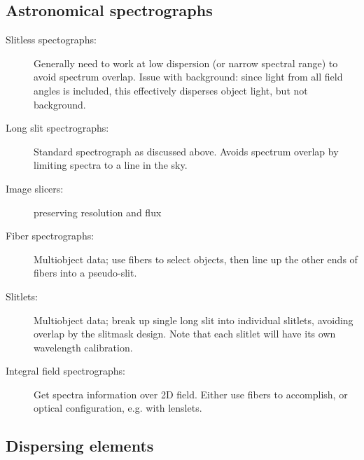\documentclass[12pt]{article}
\begin{document}
\subsection{Astronomical spectrographs}
\begin{description}
    \item [Slitless spectographs:]
        Generally need to work at low dispersion (or narrow spectral range)
        to avoid spectrum overlap. Issue with background: since light from
        all field angles is included, this effectively disperses object
        light, but not background.
    \item [Long slit spectrographs:] Standard spectrograph as discussed above.
        Avoids spectrum overlap by limiting spectra to a line in the sky.
    \item [Image slicers:] preserving resolution and flux
    \item [Fiber spectrographs:] Multiobject data; use fibers to select
        objects, then line up the other ends of fibers into a pseudo-slit.
    \item [Slitlets:] Multiobject data; break up single long slit into
        individual slitlets, avoiding overlap by the slitmask design. Note
        that each slitlet will have its own wavelength calibration.
    \item [Integral field spectrographs:] Get spectra information over 2D
        field. Either use fibers to accomplish, or optical configuration,
        e.g. with lenslets.
\end{description}

\subsection{Dispersing elements}
\end{document}
